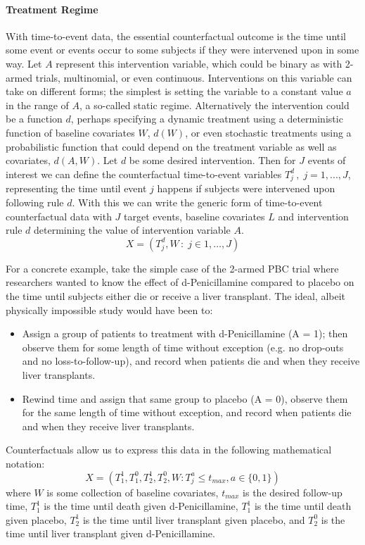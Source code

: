\documentclass{report}
\newcommand{\1}{\ensuremath{\mathbf{1}}}
\renewcommand{\L}{\ensuremath{W}}
\begin{document}
\paragraph{Treatment Regime}
\label{TreatmentRegime}
With time-to-event data, the essential counterfactual outcome is the time until some event or events occur to some subjects if they were intervened upon in some way. Let \(A\) represent this intervention variable, which could be binary as with 2-armed trials, multinomial, or even continuous. Interventions on this variable can take on different forms; the simplest is setting the variable to a constant value \(a\) in the range of \(A\), a so-called static regime. Alternatively the intervention could be a function \(d\), perhaps specifying a dynamic treatment using a deterministic function of baseline covariates \(\L\), \(d(\L)\), or even stochastic treatments using a probabilistic function that could depend on the treatment variable as well as covariates, \(d(A, \L)\). Let \(d\) be some desired intervention. Then for \(J\) events of interest we can define the counterfactual time-to-event variables \(T^d_j \,,\; j = 1, ..., J\), representing the time until event \(j\) happens if subjects were intervened upon following rule \(d\). With this we can write the generic form of time-to-event counterfactual data with \(J\) target events, baseline covariates \(L\) and intervention rule \(d\) determining the value of intervention variable \(A\).
\[ X = \left( T^d_j, \L \,:\; j \in 1, \dots, J \right)\]

For a concrete example, take the simple case of the 2-armed PBC trial where researchers wanted to know the effect of d-Penicillamine compared to placebo on the time until subjects either die or receive a liver transplant. The ideal, albeit physically impossible study would have been to:
\begin{itemize}
\item Assign a group of patients to treatment with d-Penicillamine (A = 1); then observe them for some length of time without exception (e.g. no drop-outs and no loss-to-follow-up), and record when patients die and when they receive liver transplants.
\item Rewind time and assign that same group to placebo (A = 0), observe them for the same length of time without exception, and record when patients die and when they receive liver transplants.
\end{itemize}

Counterfactuals allow us to express this data in the following mathematical notation:
\[ X = (T^1_1, T^0_1, T^1_2, T^0_2, \L : T^a_j \leq t_{max},  a \in \{0, 1\}) \]
where \(\L\) is some collection of baseline covariates, \(t_{max}\) is the desired follow-up time, \(T^1_1\) is the time until death given d-Penicillamine, \(T^1_1\) is the time until death given placebo, \(T^1_2\) is the time until liver transplant given placebo, and \(T^0_2\) is the time until liver transplant given d-Penicillamine.
\end{document}
